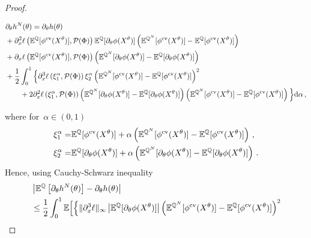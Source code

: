 \begin{proof}
\begin{small}
\begin{equation*}
\begin{split}
 	&\partial_{\theta}h^{N}(\theta) =  \partial_{\theta}h(\theta) \\ 
 	& + \partial_x^2 \ell\left(\mathbb{E}^{\mathbb{Q}}[\phi^{\textup{cv}}(X^{\theta})],\mathcal{P}(\Phi) \right) \mathbb{E}^{\mathbb{Q}}[\partial_\theta \phi(X^{\theta})]\left(\mathbb{E}^{\mathbb{Q}^N}[\phi^{\textup{cv}}(X^{\theta})]  - \mathbb{E}^{\mathbb{Q}}[\phi^{\textup{cv}}(X^{\theta})]  \right)  \\
        & + \partial_x \ell\left(\mathbb{E}^{\mathbb{Q}}[\phi^{\textup{cv}}(X^{\theta})],\mathcal{P}(\Phi) \right) \left( \mathbb{E}^{\mathbb{Q}^N}[\partial_\theta \phi(X^{\theta})]  - \mathbb{E}^{\mathbb{Q}}[\partial_\theta \phi(X^{\theta})]  \right) \\
        & + \frac{1}{2} \int_{0}^1 \Big\{\partial_x^3 \ell\left(\xi_1^{\alpha},\mathcal{P}(\Phi) \right) \xi_2^{\alpha}\left(\mathbb{E}^{\mathbb{Q}^N}[\phi^{\textup{cv}}(X^{\theta})]  - \mathbb{E}^{\mathbb{Q}}[\phi^{\textup{cv}}(X^{\theta})]  \right)^2 \\
        & \qquad + 2 \partial_x^2 \ell\left(\xi_1^{\alpha},\mathcal{P}(\Phi) \right) \left(\mathbb{E}^{\mathbb{Q}^N}[\partial_{\theta}\phi(X^{\theta})]  - \mathbb{E}^{\mathbb{Q}}[\partial_{\theta}\phi(X^{\theta})]  \right) \left(\mathbb{E}^{\mathbb{Q}^N}[\phi^{\textup{cv}}(X^{\theta})]  - \mathbb{E}^{\mathbb{Q}}[\phi^{\textup{cv}}(X^{\theta})]  \right)\Big\} \mathrm{d}\alpha\,,
\end{split}
\end{equation*}
\end{small}
where for~$\alpha\in(0,1)$
 \[
 \begin{split}
 \xi_1^{\alpha} = &  \mathbb{E}^{\mathbb{Q}}[\phi^{\textup{cv}}(X^{\theta})]  + \alpha \left(
 \mathbb{E}^{\mathbb{Q}^N}[\phi^{\textup{cv}}(X^{\theta})] - \mathbb{E}^{\mathbb{Q}}[\phi^{\textup{cv}}(X^{\theta})] \right)\,, \\ 
  \xi_2^{\alpha} = &  \mathbb{E}^{\mathbb{Q}}[\partial_\theta \phi(X^{\theta})] + \alpha \left( \mathbb{E}^{\mathbb{Q}^N}[\partial_\theta \phi(X^{\theta})] - \mathbb{E}^{\mathbb{Q}}[\partial_\theta \phi(X^{\theta})] \right)\,.
 \end{split}
 \]
 Hence, using Cauchy-Schwarz inequality 
 \[
 \begin{split}
 	&\left| \EE^{\QQ}\left[\partial_{\theta} h^{N}(\theta)\right] -  \partial_{\theta}h(\theta) \right|\\ 
 	 & \leq \frac{1}{2} \int_{0}^1 \EE \Big[ \Big\{ \| \partial_x^3 \ell\|_{\infty} \left| \EE^{\QQ}[\partial_\theta \phi(X^{\theta})]\right| \left(\EE^{\QQ^N}[\phi^{\textup{cv}}(X^{\theta})]  - \EE^{\QQ}[\phi^{\textup{cv}}(X^{\theta})]  \right)^2 \\

\end{split}\]
\end{proof}
